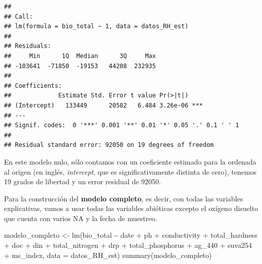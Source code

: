 \documentclass[
]{book}
\newenvironment{Shaded}{\begin{snugshade}}{\end{snugshade}}
\newcommand{\AttributeTok}[1]{\textcolor[rgb]{0.77,0.63,0.00}{#1}}
\newcommand{\FunctionTok}[1]{\textcolor[rgb]{0.00,0.00,0.00}{#1}}
\newcommand{\NormalTok}[1]{#1}
\newcommand{\OtherTok}[1]{\textcolor[rgb]{0.56,0.35,0.01}{#1}}
\newcommand{\SpecialCharTok}[1]{\textcolor[rgb]{0.00,0.00,0.00}{#1}}
\begin{document}
\begin{verbatim}
## 
## Call:
## lm(formula = bio_total ~ 1, data = datos_RH_est)
## 
## Residuals:
##     Min      1Q  Median      3Q     Max 
## -103641  -71850  -19153   44208  232935 
## 
## Coefficients:
##             Estimate Std. Error t value Pr(>|t|)    
## (Intercept)   133449      20582   6.484 3.26e-06 ***
## ---
## Signif. codes:  0 '***' 0.001 '**' 0.01 '*' 0.05 '.' 0.1 ' ' 1
## 
## Residual standard error: 92050 on 19 degrees of freedom
\end{verbatim}

En este modelo nulo, sólo contamos con un coeficiente estimado para la ordenada al origen (en inglés, \emph{intercept}, que es significativamente distinta de cero), tenemos 19 grados de libertad y un error residual de 92050.

Para la construcción del \textbf{modelo completo}, es decir, con todas las variables explicativas, vamos a usar todas las variables abióticas excepto el oxígeno disuelto que cuenta con varios NA y la fecha de muestreo.

\begin{Shaded}
\begin{Highlighting}[]
\NormalTok{modelo\_completo }\OtherTok{\textless{}{-}} \FunctionTok{lm}\NormalTok{(bio\_total }\SpecialCharTok{\textasciitilde{}}\NormalTok{ date }\SpecialCharTok{+}\NormalTok{ ph }\SpecialCharTok{+}\NormalTok{ conductivity }\SpecialCharTok{+}\NormalTok{  total\_hardness }\SpecialCharTok{+}\NormalTok{ doc }\SpecialCharTok{+}\NormalTok{ din }\SpecialCharTok{+}\NormalTok{ total\_nitrogen }\SpecialCharTok{+}\NormalTok{ drp }\SpecialCharTok{+}\NormalTok{ total\_phosphorus }\SpecialCharTok{+}\NormalTok{ ag\_440  }\SpecialCharTok{+}\NormalTok{ suva254 }\SpecialCharTok{+}\NormalTok{ ms\_index, }\AttributeTok{data =}\NormalTok{ datos\_RH\_est)}
\FunctionTok{summary}\NormalTok{(modelo\_completo)}
\end{Highlighting}
\end{Shaded}
\end{document}
